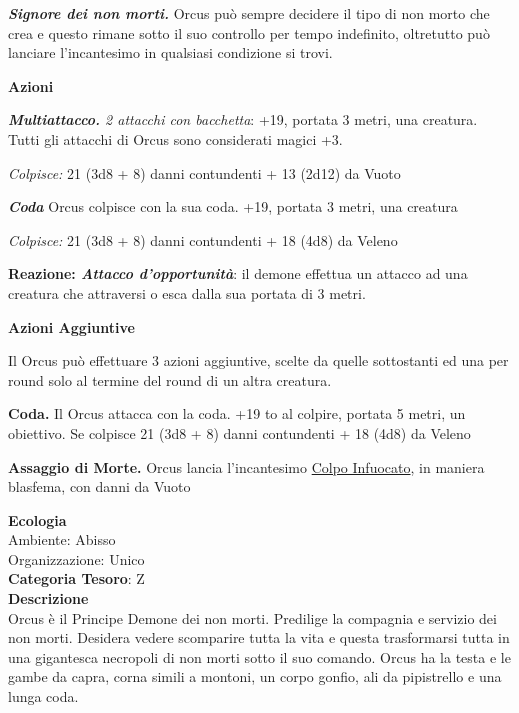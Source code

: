 \begin{multicols}{2}
{\emph{\textbf{Signore dei non morti.}} Orcus può sempre decidere il tipo di non morto che crea e questo rimane sotto il suo controllo per tempo indefinito, oltretutto può lanciare l'incantesimo in qualsiasi condizione si trovi.

\textbf{Azioni}

\emph{\textbf{Multiattacco.} 2 attacchi con bacchetta}: +19, portata 3 metri, una creatura. Tutti gli attacchi di Orcus sono considerati magici +3.

\emph{Colpisce:} 21 (3d8 + 8) danni contundenti + 13 (2d12) da Vuoto

\emph{\textbf{Coda}} Orcus colpisce con la sua coda. +19, portata 3 metri, una creatura

\emph{Colpisce:} 21 (3d8 + 8) danni contundenti + 18 (4d8) da Veleno

\textbf{Reazione: \emph{Attacco d'opportunità}}: il demone effettua un attacco ad una creatura che attraversi o esca dalla sua portata di 3 metri.

\textbf{Azioni Aggiuntive}

Il Orcus può effettuare 3 azioni aggiuntive, scelte da quelle sottostanti ed una per round solo al termine del round di un altra creatura.

\textbf{Coda.} Il Orcus attacca con la coda. +19 to al colpire, portata 5 metri, un obiettivo. Se colpisce 21 (3d8 + 8) danni contundenti + 18 (4d8) da Veleno

\textbf{Assaggio di Morte.} Orcus lancia l'incantesimo \hyperlink{Colpo Infuocato}{Colpo Infuocato}, in maniera blasfema, con danni da Vuoto

\textbf{Ecologia}\\
Ambiente: Abisso\\
Organizzazione: Unico\\
\textbf{Categoria Tesoro}: Z\\
\textbf{Descrizione}\\
Orcus è il Principe Demone dei non morti. Predilige la compagnia e servizio dei non morti. Desidera vedere scomparire tutta la vita e questa trasformarsi tutta in una gigantesca necropoli di non morti sotto il suo comando. Orcus ha la testa e le gambe da capra, corna simili a montoni, un corpo gonfio, ali da pipistrello e una lunga coda.

}
\end{multicols}
